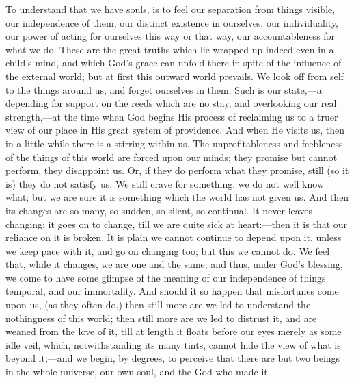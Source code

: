 To understand that we have souls, is to feel our
separation from things visible, our independence of them,
our distinct existence in ourselves, our individuality,
our power of acting for ourselves this way or that way,
our accountableness for what we do. These are the great
truths which lie wrapped up indeed even in a child's
mind, and which God's grace can unfold there in spite of
the influence of the external world; but at first this
outward world prevails. We look off from self to the
things around us, and forget ourselves in them. Such is
our state,—a depending for support on the reeds
which are no stay, and overlooking our real
strength,—at the time when God begins His process of
reclaiming us to a truer view of our place in His great
system of providence. And when He visits us, then in a
little while there is a stirring within us. The
unprofitableness and feebleness of the things of this
world are forced upon our minds; they promise but cannot perform, they disappoint us. Or, if they do perform what
they promise, still (so it is) they do not satisfy us. We
still crave for something, we do not well know what; but
we are sure it is something which the world has not given
us. And then its changes are so many, so sudden, so
silent, so continual. It never leaves changing; it goes
on to change, till we are quite sick at heart:—then
it is that our reliance on it is broken. It is plain we
cannot continue to depend upon it, unless we keep pace
with it, and go on changing too; but this we cannot do. We
feel that, while it changes, we are one and the same; and
thus, under God's blessing, we come to have some glimpse
of the meaning of our independence of things temporal,
and our immortality. And should it so happen that
misfortunes come upon us, (as they often do,) then still
more are we led to understand the nothingness of this
world; then still more are we led to distrust it, and are
weaned from the love of it, till at length it floats
before our eyes merely as some idle veil, which,
notwithstanding its many tints, cannot hide the view of
what is beyond it;—and we begin, by degrees, to
perceive that there are but two beings in the whole
universe, our own soul, and the God who made it.

